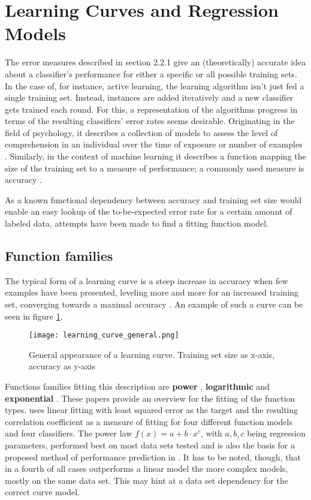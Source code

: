 \section{Learning Curves and Regression Models}
The error measures described in section 2.2.1 give an (theoretically) accurate idea about a classifier's performance for either a specific or all possible training sets. In the case of, for instance, active learning, the learning algorithm isn't just fed a single training set. Instead, instances are added iteratively and a new classifier gets trained each round. For this, a representation of the algorithms progress in terms of the resulting classifiers' error rates seems desirable. Originating in the field of psychology, it describes a collection of models to assess the level of comprehension in an individual over the time of exposure or number of examples \cite{Yelle1979}. Similarly, in the context of machine learning it describes a function mapping the size of the training set to a measure of performance; a commonly used measure is accuracy \cite{PerlichEtAl2003}.

As a known functional dependency between accuracy and training set size would enable an easy lookup of the to-be-expected error rate for a certain amount of labeled data, attempts have been made to find a fitting function model.

\subsection{Function families}
The typical form of a learning curve is a steep increase in accuracy when few examples have been presented, leveling more and more for an increased training set, converging towards a maximal accuracy \cite{FigueroaEtal2012}. An example of such a curve can be seen in figure \ref{fig:curve_general}.
\begin{figure}[h]
	\texttt{[image: learning\_curve\_general.png]}
	\caption{General appearance of a learning curve. Training set size as x-axis, accuracy as y-axis \cite{FigueroaEtal2012}}
	\label{fig:curve_general}
\end{figure}

Functions families fitting this description are \textbf{power} \cite{FigueroaEtal2012,Singh2005}, \textbf{logarithmic} and \textbf{exponential} \cite{Singh2005}. These papers provide an overview for the fitting of the function types. \cite{Singh2005} uses linear fitting with least squared error as the target and the resulting correlation coefficient as a measure of fitting for four different function models and four classifiers. The power law $f(x) = a + b \cdot x^c$, with $a, b, c$ being regression parameters, performed best on most data sets tested and is also the basis for a proposed method of performance prediction in \cite{FigueroaEtal2012}. It has to be noted, though, that in a fourth of all cases outperforms a linear model the more complex models, mostly on the same data set. This may hint at a data set dependency for the correct curve model.

